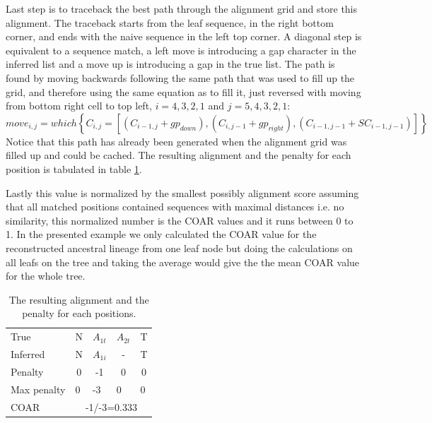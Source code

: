 Last step is to traceback the best path through the alignment grid and store this alignment.
The traceback starts from the leaf sequence, in the right bottom corner, and ends with the naive sequence in the left top corner.
A diagonal step is equivalent to a sequence match, a left move is introducing a gap character in the inferred list and a move up is introducing a gap in the true list.
The path is found by moving backwards following the same path that was used to fill up the grid, and therefore using the same equation as to fill it, just reversed with moving from bottom right cell to top left, $i=4,3,2,1$ and $j=5,4,3,2,1$:
$$
move_{i,j} = which\left\{ C_{i,j} = [(C_{i-1,j} + gp_{down}), (C_{i,j-1} + gp_{right}), (C_{i-1,j-1 } + SC_{i-1,j-1})] \right\}
$$
Notice that this path has already been generated when the alignment grid was filled up and could be cached. The resulting alignment and the penalty for each position is tabulated in table \ref{NW_final_alignment}.

Lastly this value is normalized by the smallest possibly alignment score assuming that all matched positions contained sequences with maximal distances i.e. no similarity, this normalized number is the COAR values and it runs between 0 to 1.
In the presented example we only calculated the COAR value for the reconstructed ancestral lineage from one leaf node but doing the calculations on all leafs on the tree and taking the average would give the the mean COAR value for the whole tree.
\begin{table}[ht!]
\centering
\begin{tabular}{|lcccc|}
\hline
\multicolumn{1}{|l|}{True}     & \multicolumn{1}{c|}{N} & \multicolumn{1}{c|}{$A_{1t}$} & \multicolumn{1}{c|}{$A_{2t}$} & T                      \\
\multicolumn{1}{|l|}{Inferred} & \multicolumn{1}{c|}{N} & \multicolumn{1}{c|}{$A_{1i}$} & \multicolumn{1}{c|}{-}        & T                      \\ \hline
Penalty                        & 0                      & -1                             & 0                           & 0                      \\ \hline
Max penalty                    & \multicolumn{1}{l}{0}  & \multicolumn{1}{l}{-3}        & \multicolumn{1}{l}{0}       & \multicolumn{1}{l|}{0} \\ \hline
COAR                           & \multicolumn{4}{c|}{-1/-3=0.333}                                                                                    \\ \hline
\end{tabular}
    \caption{
         \label{NW_final_alignment}
             The resulting alignment and the penalty for each positions.
             }
\end{table}





